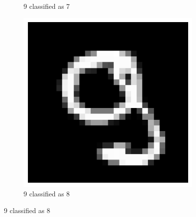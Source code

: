 \documentclass{article}
\begin{document}
\begin{figure}[H]
\begin{subfigure}[b]{0.3\textwidth}
        \caption{9 classified as 7}
        \label{fig:digit2}
    \end{subfigure}
    \hfill
    \begin{subfigure}[b]{0.3\textwidth}
        \centering
        \includegraphics[width=\textwidth]{digit3.png}
        \caption{9 classified as 8}
        \label{fig:digit3}
    \end{subfigure}
    
    \vspace{1cm}
    

\end{figure}
\end{document}
